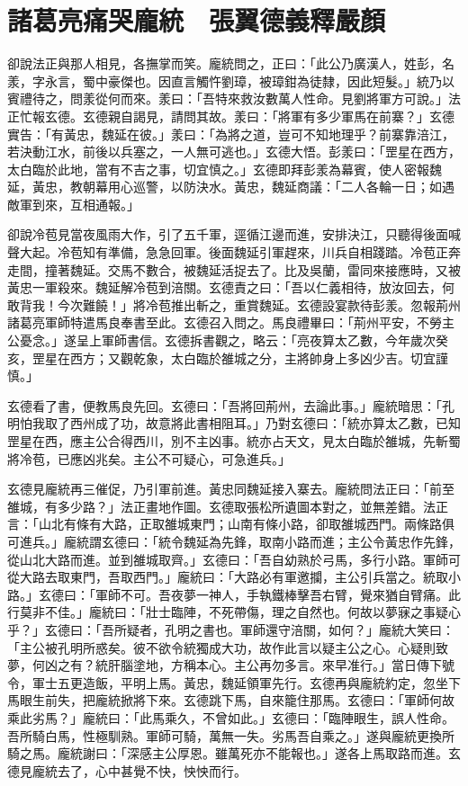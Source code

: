 
\chapter{諸葛亮痛哭龐統　張翼德義釋嚴顏}

卻說法正與那人相見，各撫掌而笑。龐統問之，正曰：「此公乃廣漢人，姓彭，名羕，字永言，蜀中豪傑也。因直言觸忤劉璋，被璋鉗為徒隸，因此短髮。」統乃以賓禮待之，問羕從何而來。羕曰：「吾特來救汝數萬人性命。見劉將軍方可說。」法正忙報玄德。玄德親自謁見，請問其故。羕曰：「將軍有多少軍馬在前寨？」玄德實告：「有黃忠，魏延在彼。」羕曰：「為將之道，豈可不知地理乎？前寨靠涪江，若決動江水，前後以兵塞之，一人無可逃也。」玄德大悟。彭羕曰：「罡星在西方，太白臨於此地，當有不吉之事，切宜慎之。」玄德即拜彭羕為幕賓，使人密報魏延，黃忠，教朝幕用心巡警，以防決水。黃忠，魏延商議：「二人各輪一日；如遇敵軍到來，互相通報。」

卻說冷苞見當夜風雨大作，引了五千軍，逕循江邊而進，安排決江，只聽得後面喊聲大起。冷苞知有準備，急急回軍。後面魏延引軍趕來，川兵自相踐踏。冷苞正奔走間，撞著魏延。交馬不數合，被魏延活捉去了。比及吳蘭，雷同來接應時，又被黃忠一軍殺來。魏延解冷苞到涪關。玄德責之曰：「吾以仁義相待，放汝回去，何敢背我！今次難饒！」將冷苞推出斬之，重賞魏延。玄德設宴款待彭羕。忽報荊州諸葛亮軍師特遣馬良奉書至此。玄德召入問之。馬良禮畢曰：「荊州平安，不勞主公憂念。」遂呈上軍師書信。玄德拆書觀之，略云：「亮夜算太乙數，今年歲次癸亥，罡星在西方；又觀乾象，太白臨於雒城之分，主將帥身上多凶少吉。切宜謹慎。」

玄德看了書，便教馬良先回。玄德曰：「吾將回荊州，去論此事。」龐統暗思：「孔明怕我取了西州成了功，故意將此書相阻耳。」乃對玄德曰：「統亦算太乙數，已知罡星在西，應主公合得西川，別不主凶事。統亦占天文，見太白臨於雒城，先斬蜀將冷苞，已應凶兆矣。主公不可疑心，可急進兵。」

玄德見龐統再三催促，乃引軍前進。黃忠同魏延接入寨去。龐統問法正曰：「前至雒城，有多少路？」法正畫地作圖。玄德取張松所遺圖本對之，並無差錯。法正言：「山北有條有大路，正取雒城東門；山南有條小路，卻取雒城西門。兩條路俱可進兵。」龐統謂玄德曰：「統令魏延為先鋒，取南小路而進；主公令黃忠作先鋒，從山北大路而進。並到雒城取齊。」玄德曰：「吾自幼熟於弓馬，多行小路。軍師可從大路去取東門，吾取西門。」龐統曰：「大路必有軍邀攔，主公引兵當之。統取小路。」玄德曰：「軍師不可。吾夜夢一神人，手執鐵棒擊吾右臂，覺來猶自臂痛。此行莫非不佳。」龐統曰：「壯士臨陣，不死帶傷，理之自然也。何故以夢寐之事疑心乎？」玄德曰：「吾所疑者，孔明之書也。軍師還守涪關，如何？」龐統大笑曰：「主公被孔明所惑矣。彼不欲令統獨成大功，故作此言以疑主公之心。心疑則致夢，何凶之有？統肝腦塗地，方稱本心。主公再勿多言。來早准行。」當日傳下號令，軍士五更造飯，平明上馬。黃忠，魏延領軍先行。玄德再與龐統約定，忽坐下馬眼生前失，把龐統掀將下來。玄德跳下馬，自來籠住那馬。玄德曰：「軍師何故乘此劣馬？」龐統曰：「此馬乘久，不曾如此。」玄德曰：「臨陣眼生，誤人性命。吾所騎白馬，性極馴熟。軍師可騎，萬無一失。劣馬吾自乘之。」遂與龐統更換所騎之馬。龐統謝曰：「深感主公厚恩。雖萬死亦不能報也。」遂各上馬取路而進。玄德見龐統去了，心中甚覺不快，怏怏而行。

